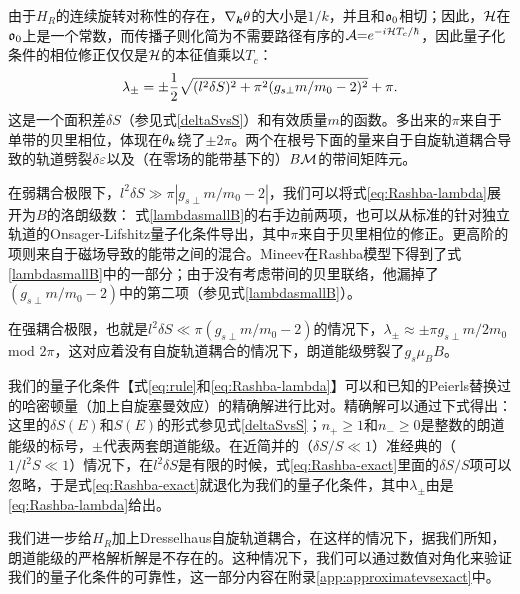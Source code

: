 由于$H_R$的连续旋转对称性的存在，$\nabla_{\boldsymbol{k}} \theta$的大小是$1/k$，并且和$\mathfrak{o}_0$相切；因此，${\cal H}$在$\mathfrak{o}_0$上是一个常数，而传播子则化简为不需要路径有序的${\cal A}{=}e^{{-}i{\cal H} T_c/\hbar}$，因此量子化条件的相位修正仅仅是${\cal H}$的本征值乘以$T_c$：
\begin{equation}
\lambda_{\pm}=\pm\frac{1}{2}\sqrt{({l^2\delta S})^2+\pi^2(g_{s\perp}m/m_0-2)^2}+\pi. \label{eq:Rashba-lambda}
\end{equation}
这是一个面积差$\delta S$（参见式\ref{deltaSvsS}）和有效质量$m$的函数。多出来的$\pi$来自于单带的贝里相位，体现在$\theta_{\boldsymbol{k}}$绕了${\pm}2\pi$。两个在根号下面的量来自于自旋轨道耦合导致的轨道劈裂$\delta \varepsilon$以及（在零场的能带基下的）$B{\cal M}$的带间矩阵元。

在弱耦合极限下，$l^2\delta S \gg \pi|g_{s\perp} m/m_0{-}2|$，我们可以将式\ref{eq:Rashba-lambda}展开为$B$的洛朗级数：
式\ref{lambdasmallB}的右手边前两项，也可以从标准的针对独立轨道的Onsager-Lifshitz量子化条件导出，其中$\pi$来自于贝里相位的修正。更高阶的项则来自于磁场导致的能带之间的混合。Mineev在Rashba模型下得到了式\ref{lambdasmallB}中的一部分\cite{mineev_haas--van_2005}；由于没有考虑带间的贝里联络，他漏掉了$(g_{s\perp}m/m_0-2)$中的第二项（参见式\ref{lambdasmallB}）。

在强耦合极限，也就是$l^2\delta S {\ll}\pi(g_{s\perp}m/m_0{-}2)$的情况下，$\lambda_{\pm}{\approx}{\pm}\pi g_{s\perp}m/2m_0$ mod $2\pi$，这对应着没有自旋轨道耦合的情况下，朗道能级劈裂了$g_{s}\mu_BB$。

我们的量子化条件【式\ref{eq:rule}和\ref{eq:Rashba-lambda}】可以和已知的Peierls替换过的哈密顿量（加上自旋塞曼效应）的精确解进行比对。精确解\cite{bychkov_oscillatory_1984}可以通过下式得出：
这里的$\delta S(E)$和$S(E)$的形式参见式\ref{deltaSvsS}；$n_{+}{\ge} 1$和$n_-{\ge} 0$是整数的朗道能级的标号，$\pm$代表两套朗道能级。在近简并的（$\delta S/S\ll 1$）准经典的（$1/l^2S \ll 1$）情况下，在$l^2\delta S$是有限的时候，式\ref{eq:Rashba-exact}里面的$\delta S/S$项可以忽略，于是式\ref{eq:Rashba-exact}就退化为我们的量子化条件，其中$\lambda_{\pm}$由是\ref{eq:Rashba-lambda}给出。


我们进一步给$H_R$加上Dresselhaus自旋轨道耦合，在这样的情况下，据我们所知，朗道能级的严格解析解是不存在的。这种情况下，我们可以通过数值对角化来验证我们的量子化条件的可靠性，这一部分内容在附录\ref{app:approximatevsexact}中。

